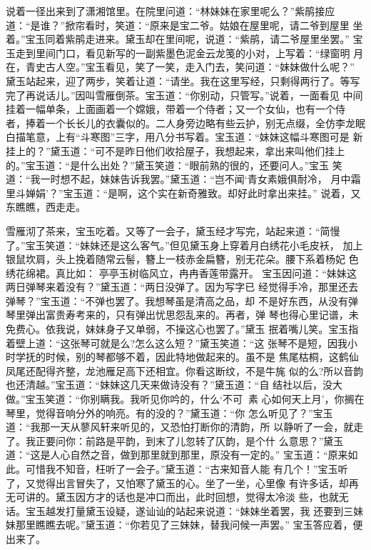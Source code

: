 说着一径出来到了潇湘馆里。在院里问道：“林妹妹在家里呢么？”紫鹃接应
道：“是谁？”掀帘看时，笑道：“原来是宝二爷。姑娘在屋里呢，请二爷到屋里
坐着。”宝玉同着紫鹃走进来。黛玉却在里间呢，说道：“紫鹃，请二爷屋里坐罢。”
宝玉走到里间门口，看见新写的一副紫墨色泥金云龙笺的小对，上写着：“绿窗明
月在，青史古人空。”宝玉看见，笑了一笑，走入门去，笑问道：“妹妹做什么呢？”
黛玉站起来，迎了两步，笑着让道：“请坐。我在这里写经，只剩得两行了。等写
完了再说话儿。”因叫雪雁倒茶。宝玉道：“你别动，只管写。”说着，一面看见
中间挂着一幅单条，上面画着一个嫦娥，带着一个侍者；又一个女仙，也有一个侍
者，捧着一个长长儿的衣囊似的。二人身旁边略有些云护，别无点缀，全仿李龙眠
白描笔意，上有“斗寒图”三字，用八分书写着。宝玉道：“妹妹这幅斗寒图可是
新挂上的？”黛玉道：“可不是昨日他们收拾屋子，我想起来，拿出来叫他们挂上
的。”宝玉道：“是什么出处？”黛玉笑道：“眼前熟的很的，还要问人。”宝玉
笑道：“我一时想不起，妹妹告诉我罢。”黛玉道：“岂不闻‘青女素娥俱耐冷，
月中霜里斗婵娟’？”宝玉道：“是啊，这个实在新奇雅致。却好此时拿出来挂。”
说着，又东瞧瞧，西走走。

雪雁沏了茶来，宝玉吃着。又等了一会子，黛玉经才写完，站起来道：“简慢
了。”宝玉笑道：“妹妹还是这么客气。”但见黛玉身上穿着月白绣花小毛皮袄，
加上银鼠坎肩，头上挽着随常云髻，簪上一枝赤金扁簪，别无花朵。腰下系着杨妃
色绣花绵裙。真比如：
亭亭玉树临风立，冉冉香莲带露开。
宝玉因问道：“妹妹这两日弹琴来着没有？”黛玉道：“两日没弹了。因为写字已
经觉得手冷，那里还去弹琴？”宝玉道：“不弹也罢了。我想琴虽是清高之品，却
不是好东西，从没有弹琴里弹出富贵寿考来的，只有弹出忧思怨乱来的。再者，弹
琴也得心里记谱，未免费心。依我说，妹妹身子又单弱，不操这心也罢了。”黛玉
抿着嘴儿笑。宝玉指着壁上道：“这张琴可就是么?怎么这么短？”黛玉笑道：“这
张琴不是短，因我小时学抚的时候，别的琴都够不着，因此特地做起来的。虽不是
焦尾枯桐，这鹤仙凤尾还配得齐整，龙池雁足高下还相宜。你看这断纹，不是牛旄
似的么?所以音韵也还清越。”宝玉道：“妹妹这几天来做诗没有？”黛玉道：“自
结社以后，没大做。”宝玉笑道：“你别瞒我。我听见你吟的，什么‘不可，素
心如何天上月’，你搁在琴里，觉得音响分外的响亮。有的没的？”黛玉道：“你
怎么听见了？”宝玉道：“我那一天从蓼风轩来听见的，又恐怕打断你的清韵，所
以静听了一会，就走了。我正要问你：前路是平韵，到末了儿忽转了仄韵，是个什
么意思？”黛玉道：“这是人心自然之音，做到那里就到那里，原没有一定的。”
宝玉道：“原来如此。可惜我不知音，枉听了一会子。”黛玉道：“古来知音人能
有几个！”宝玉听了，又觉得出言冒失了，又怕寒了黛玉的心。坐了一坐，心里像
有许多话，却再无可讲的。黛玉因方才的话也是冲口而出，此时回想，觉得太冷淡
些，也就无话。宝玉越发打量黛玉设疑，遂讪讪的站起来说道：“妹妹坐着罢，我
还要到三妹妹那里瞧瞧去呢。”黛玉道：“你若见了三妹妹，替我问候一声罢。”
宝玉答应着，便出来了。

